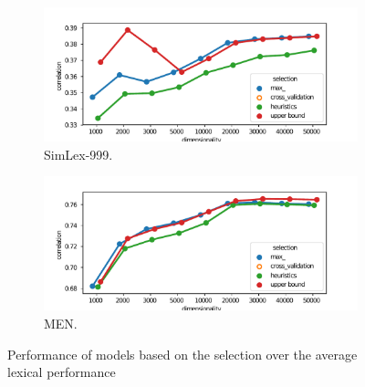 \begin{figure}
  \centering

  \begin{subfigure}[t]{0.49\textwidth}
    \includegraphics[width=\textwidth]{supplement/figures/lexical-results-SimLex999}
    \caption{SimLex-999.}
    \label{fig:lexical-results-simlex}
  \end{subfigure}
  \begin{subfigure}[t]{0.49\textwidth}
    \includegraphics[width=\textwidth]{supplement/figures/lexical-results-men}
    \caption{MEN.}
    \label{fig:lexical-results-men}
  \end{subfigure}

  \caption{Performance of models based on the selection over the average lexical performance}
  \label{fig:lexical-results}
\end{figure}

